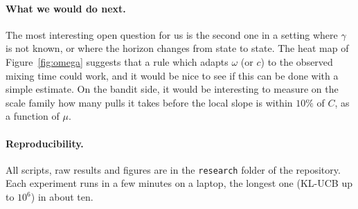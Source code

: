 \paragraph{What we would do next.} The most interesting open question for us is the second one in a setting where $\gamma$ is not known, or where the horizon changes from state to state. The heat map of Figure~\ref{fig:omega} suggests that a rule which adapts $\omega$ (or $c$) to the observed mixing time could work, and it would be nice to see if this can be done with a simple estimate. On the bandit side, it would be interesting to measure on the scale family how many pulls it takes before the local slope is within $10\%$ of $C$, as a function of $\mu$.

\paragraph{Reproducibility.} All scripts, raw results and figures are in the \texttt{research} folder of the repository. Each experiment runs in a few minutes on a laptop, the longest one (KL-UCB up to $10^6$) in about ten.
